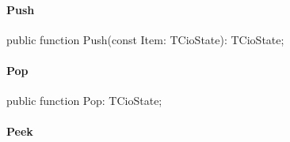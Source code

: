 \documentclass{report}
\newif\ifpdf
\begin{document}
\paragraph*{Push}\hspace*{\fill}

\label{PasDoc_Parser.TCioStateStack-Push}
\begin{list}{}{
\setlength{\itemindent}{0cm}
\setlength{\listparindent}{0cm}
\setlength{\leftmargin}{\evensidemargin}
\addtolength{\leftmargin}{\tmplength}
\settowidth{\labelsep}{X}
\addtolength{\leftmargin}{\labelsep}
\setlength{\labelwidth}{\tmplength}
}
\item[\textbf{Declaration}\hfill]
\ifpdf
\begin{flushleft}
\fi
\begin{ttfamily}
public function Push(const Item: TCioState): TCioState;\end{ttfamily}

\ifpdf
\end{flushleft}
\fi

\end{list}
\paragraph*{Pop}\hspace*{\fill}

\label{PasDoc_Parser.TCioStateStack-Pop}
\begin{list}{}{
\setlength{\itemindent}{0cm}
\setlength{\listparindent}{0cm}
\setlength{\leftmargin}{\evensidemargin}
\addtolength{\leftmargin}{\tmplength}
\settowidth{\labelsep}{X}
\addtolength{\leftmargin}{\labelsep}
\setlength{\labelwidth}{\tmplength}
}
\item[\textbf{Declaration}\hfill]
\ifpdf
\begin{flushleft}
\fi
\begin{ttfamily}
public function Pop: TCioState;\end{ttfamily}

\ifpdf
\end{flushleft}
\fi

\end{list}
\paragraph*{Peek}\hspace*{\fill}
\end{document}
